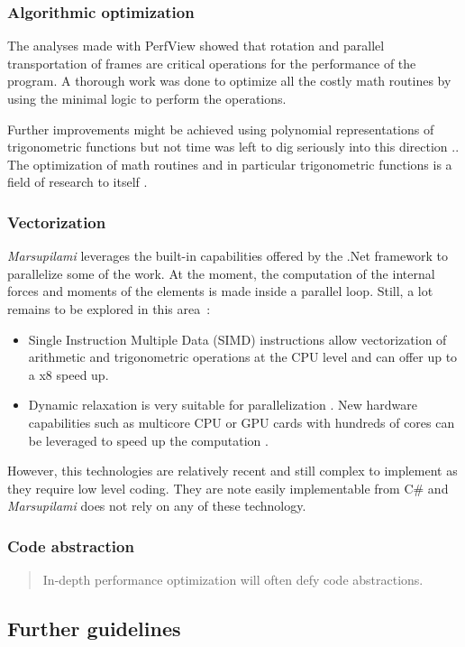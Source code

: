 \subsubsection{Algorithmic optimization}
The analyses made with PerfView showed that rotation and parallel transportation of frames are critical operations for the performance of the program. A thorough work was done to optimize all the costly math routines by using the minimal logic to perform the operations.

Further improvements might be achieved using polynomial representations of trigonometric functions but not time was left to dig seriously into this direction \cite{Trefethen2007,Chevillard2010}.\cite{Green2003}. The optimization of math routines and in particular trigonometric functions is a field of research to itself \cite{Green2003}.

\subsubsection{Vectorization}
\emph{Marsupilami} leverages the built-in capabilities offered by the .Net framework to parallelize some of the work. At the moment, the computation of the internal forces and moments of the elements is made inside a parallel loop. Still, a lot remains to be explored in this area~:
\begin{itemize}
\item Single Instruction Multiple Data (SIMD) instructions allow vectorization of arithmetic and trigonometric operations at the CPU level and can offer up to a x8 speed up.
\item Dynamic relaxation is very suitable for parallelization \cite{Topping1994}. New hardware capabilities such as multicore CPU or GPU cards with hundreds of cores can be leveraged to speed up the computation \cite{Rek2016,Liew2016}.
\end{itemize}
However, this technologies are relatively recent and still complex to implement as they require low level coding. They are note easily implementable from C\# and \emph{Marsupilami} does not rely on any of these technology.

\subsubsection{Code abstraction}
\blockcquote[p.~155]{Watson2014}{In-depth performance optimization will often defy code abstractions.}

\subsection{Further guidelines}

